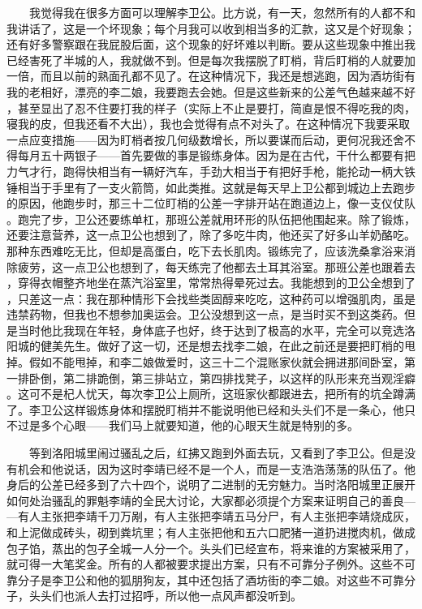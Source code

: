  　　我觉得我在很多方面可以理解李卫公。比方说，有一天，忽然所有的人都不和 我讲话了，这是一个坏现象；每个月我可以收到相当多的汇款，这又是个好现象； 还有好多警察跟在我屁股后面，这个现象的好坏难以判断。要从这些现象中推出我 已经害死了半城的人，我就做不到。但是每次我摆脱了盯梢，背后盯梢的人就要加 一倍，而且以前的熟面孔都不见了。在这种情况下，我还是想逃跑，因为酒坊街有 我的老相好，漂亮的李二娘，我要跑去会她。但是这些新来的公差气色越来越不好 ，甚至显出了忍不住要打我的样子（实际上不止是要打，简直是恨不得吃我的肉， 寝我的皮，但我还看不大出），我也会觉得有点不对头了。在这种情况下我要采取 一点应变措施——因为盯梢者按几何级数增长，所以要谋而后动，更何况我还舍不 得每月五十两银子——首先要做的事是锻练身体。因为是在古代，干什么都要有把 力气才行，跑得快相当有一辆好汽车，手劲大相当于有把好手枪，能抡动一柄大铁 锤相当于手里有了一支火箭筒，如此类推。这就是每天早上卫公都到城边上去跑步 的原因，他跑步时，那三十二位盯梢的公差一字排开站在跑道边上，像一支仪仗队 。跑完了步，卫公还要练单杠，那班公差就用环形的队伍把他围起来。除了锻炼， 还要注意营养，这一点卫公也想到了，除了多吃牛肉，他还买了好多山羊奶酪吃。 那种东西难吃无比，但却是高蛋白，吃下去长肌肉。锻练完了，应该洗桑拿浴来消 除疲劳，这一点卫公也想到了，每天练完了他都去土耳其浴室。那班公差也跟着去 ，穿得衣帽整齐地坐在蒸汽浴室里，常常热得晕死过去。我能想到的卫公全想到了 ，只差这一点：我在那种情形下会找些类固醇来吃吃，这种药可以增强肌肉，虽是 违禁药物，但我也不想参加奥运会。卫公没想到这一点，是当时买不到这类药。但 是当时他比我现在年轻，身体底子也好，终于达到了极高的水平，完全可以竞选洛 阳城的健美先生。做好了这一切，还是想去找李二娘，在此之前还是要把盯梢的甩 掉。假如不能甩掉，和李二娘做爱时，这三十二个混账家伙就会拥进那间卧室，第 一排卧倒，第二排跪倒，第三排站立，第四排找凳子，以这样的队形来充当观淫癖 。这可不是杞人忧天，每次李卫公上厕所，这班家伙都跟进去，把所有的坑全蹲满 了。李卫公这样锻炼身体和摆脱盯梢并不能说明他已经和头头们不是一条心，他只 不过是多个心眼——我们马上就要知道，他的心眼天生就是特别的多。

 　　等到洛阳城里闹过骚乱之后，红拂又跑到外面去玩，又看到了李卫公。但是没 有机会和他说话，因为这时李靖已经不是一个人，而是一支浩浩荡荡的队伍了。他 身后的公差已经多到了六十四个，说明了二进制的无穷魅力。当时洛阳城里正展开 如何处治骚乱的罪魁李靖的全民大讨论，大家都必须提个方案来证明自己的善良— —有人主张把李靖千刀万剐，有人主张把李靖五马分尸，有人主张把李靖烧成灰， 和上泥做成砖头，砌到粪坑里；有人主张把他和五六口肥猪一道扔进搅肉机，做成 包子馅，蒸出的包子全城一人分一个。头头们已经宣布，将来谁的方案被采用了， 就可得一大笔奖金。所有的人都被要求提出方案，只有不可靠分子例外。这些不可 靠分子是李卫公和他的狐朋狗友，其中还包括了酒坊街的李二娘。对这些不可靠分 子，头头们也派人去打过招呼，所以他一点风声都没听到。

